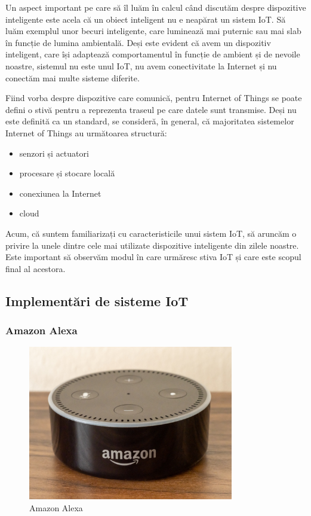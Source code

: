 Un aspect important pe care să îl luăm în calcul când discutăm despre dispozitive inteligente este acela că un obiect inteligent nu e neapărat un sistem IoT.
Să luăm exemplul unor becuri inteligente, care luminează mai puternic sau mai slab în funcție de lumina ambientală.
Deși este evident că avem un dispozitiv inteligent, care își adaptează comportamentul în funcție de ambient și de nevoile noastre, sistemul nu este unul IoT, nu avem conectivitate la Internet și nu conectăm mai multe sisteme diferite.

Fiind vorba despre dispozitive care comunică, pentru Internet of Things se poate defini o stivă pentru a reprezenta traseul pe care datele sunt transmise.
Deși nu este definită ca un standard, se consideră, în general, că majoritatea sistemelor Internet of Things au următoarea structură:

\begin{itemize}
  \item senzori și actuatori
  \item procesare și stocare locală
  \item conexiunea la Internet
  \item cloud
\end{itemize}

Acum, că suntem familiarizați cu caracteristicile unui sistem IoT, să aruncăm o privire la unele dintre cele mai utilizate dispozitive inteligente din zilele noastre.
Este important să observăm modul în care urmăresc stiva IoT și care este scopul final al acestora.

\subsection{Implementări de sisteme IoT}
\label{sec:embed:iot:impl}

\subsubsection{Amazon Alexa}
\label{sec:embed:iot:impl:alexa}

\begin{figure}[!htbp]
  \centering
  \includegraphics[width=0.8\textwidth]{chapters/15-embed/img/alexa.jpg}
  \caption{Amazon Alexa}
  \label{fig:embed:alexa}
\end{figure}

